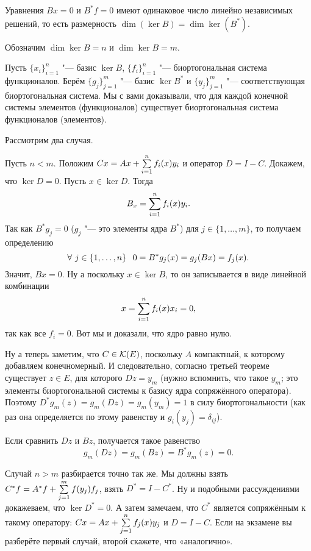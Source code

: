 \begin{The}
  Уравнения $Bx=0$ и $B^*f=0$ имеют одинаковое число линейно независимых решений, то есть размерность $\dim(\ker B) = \dim\ker(B^*)$.
\end{The}
\begin{Proof}
Обозначим $\dim\ker B = n$ и $\dim\ker B = m$.

Пусть $\{x_i\}_{i=1}^n$ "--- базис $\ker B$, 
      $\{f_i\}_{i=1}^n$ "--- биортогональная система функционалов. 
Берём $\{g_j\}_{j=1}^m$ "--- базис $\ker B^*$ и 
      $\{y_j\}_{j=1}^m$ "--- соответствующая биортогональная система.
Мы с вами доказывали, что для каждой конечной системы элементов (функционалов) существует биортогональная система функционалов (элементов).

Рассмотрим два случая.
\begin{roItems}
\item Пусть $n<m$. Положим $Cx = Ax + \sum\limits_{i = 1}^{n} f_i(x)y_i$ и оператор $D = I-C$.
Докажем, что $\ker D= 0$. Пусть $x\in \ker D$. Тогда
\[
  B_x = \sum\limits_{i = 1}^{n} f_i(x)y_i.
\]
Так как $B^*g_j=0$ ($g_j$ "--- это элементы ядра $B^*$) для $j\in\{1,\dots, m\}$, то получаем определению
\[
  \forall\ j\in\{1,\dots, n\}\pau 0=  B^*g_j(x) = g_j(Bx) = f_j(x).
\]
Значит, $Bx=0$. Ну а поскольку $x\in\ker B$, то он записывается в виде линейной комбинации
\[
  x = \sum\limits_{i = 1}^{n} f_i(x) x_i  = 0,
\]
так как все $f_i=0$. Вот мы и доказали, что ядро равно нулю.

Ну а теперь заметим, что $C\in \mathcal K(E)$, поскольку $A$ компактный, к которому добавляем конечномерный. И следовательно, согласно третьей теореме существует $z\in E$, для которого $Dz = y_m$  (нужно вспомнить, что такое $y_m$; это элементы биортогональной системы к базису ядра сопряжённого оператора). Поэтому $D^*g_m(z) = g_m(Dz) = g_m(y_m) = 1$ в силу биортогональности (как раз она определяется по этому равенству и $g_i(y_j) = \delta_{ij}$).

Если сравнить $Dz$ и $Bz$, получается такое равенство
\[
  g_m(Dz) = g_m(Bz) = B^*g_m(z)=0.
\]

\item Случай $n>m$ разбирается точно так же. Мы должны взять $C^*f = A^*f + \sum\limits_{j = 1}^{m} f(y_j) f_j$, взять $D^* = I - C^*$. Ну и подобными рассуждениями докажеваем, что $\ker D^*=0$. А затем замечаем, что $C^*$ является сопряжённым к такому оператору: $C x = Ax + \sum\limits_{j = 1}^{n} f_j(x) y_j$ и $D = I-C$. Если на экзамене вы разберёте первый случай, второй скажете, что «аналогично».
\end{roItems}
\end{Proof}

